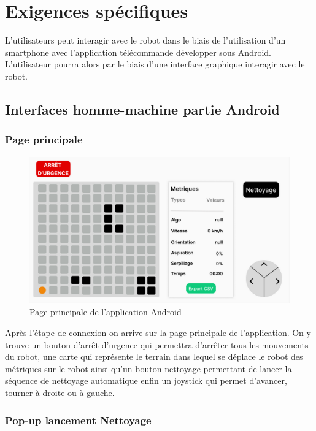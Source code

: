 \section{Exigences spécifiques}

L'utilisateurs peut interagir avec le robot dans le biais de l'utilisation d'un smartphone avec l'application télécommande développer sous Android. L'utilisateur pourra alors par le biais d'une interface graphique interagir avec le robot. 

\subsection{Interfaces homme-machine partie Android}

\subsubsection{Page principale}

\begin{figure}[H]
    \centering
    \includegraphics[scale=0.25]{data/IHM1.png}
    \caption{Page principale de l'application Android}
    \label{fig:ihm_android_main}
\end{figure}

Après l'étape de connexion on arrive sur la page principale de l'application. On y trouve un bouton d'arrêt d'urgence qui permettra d'arrêter tous les mouvements du robot, une carte qui représente le terrain dans lequel se déplace le robot des métriques sur le robot ainsi qu'un bouton nettoyage permettant de lancer la séquence de nettoyage automatique enfin un joystick qui permet d'avancer, tourner à droite ou à gauche. 

\subsubsection{Pop-up lancement Nettoyage}

